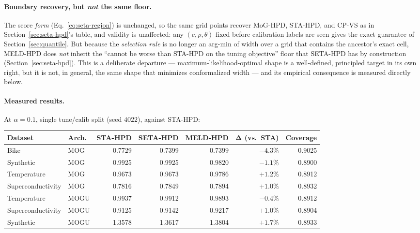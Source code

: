 \documentclass[11pt]{article}
\begin{document}
\paragraph{Boundary recovery, but \emph{not} the same floor.} The score \emph{form}
(Eq.~\eqref{eq:seta-region}) is unchanged, so the same grid points recover MoG-HPD, STA-HPD, and
CP-VS as in Section~\ref{sec:seta-hpd}'s table, and validity is unaffected: any $(c,\rho,\theta)$
fixed before calibration labels are seen gives the exact guarantee of Section~\ref{sec:quantile}.
But because the \emph{selection rule} is no longer an arg-min of width over a grid that contains
the ancestor's exact cell, MELD-HPD does \emph{not} inherit the ``cannot be worse than STA-HPD on
the tuning objective'' floor that SETA-HPD has by construction (Section~\ref{sec:seta-hpd}). This
is a deliberate departure --- maximum-likelihood-optimal shape is a well-defined, principled target
in its own right, but it is not, in general, the same shape that minimizes conformalized width ---
and its empirical consequence is measured directly below.

\paragraph{Measured results.} At $\alpha=0.1$, single tune/calib split (seed $4022$), against
STA-HPD:

\begin{center}
\begin{tabular}{@{}llrrrrr@{}}
\toprule
\textbf{Dataset} & \textbf{Arch.} & \textbf{STA-HPD} & \textbf{SETA-HPD} & \textbf{MELD-HPD} &
$\bm\Delta$ (vs.\ STA) & Coverage \\
\midrule
Bike               & MOG  & 0.7729 & 0.7399 & $\bm{0.7399}$ & $\bm{-4.3\%}$ & 0.9025 \\
Synthetic          & MOG  & 0.9925 & 0.9925 & $\bm{0.9820}$ & $\bm{-1.1\%}$ & 0.8900 \\
Temperature        & MOG  & 0.9673 & 0.9673 & 0.9786 & $+1.2\%$ & 0.8912 \\
Superconductivity  & MOG  & 0.7816 & 0.7849 & 0.7894 & $+1.0\%$ & 0.8932 \\
Temperature        & MOGU & 0.9937 & 0.9912 & $\bm{0.9893}$ & $\bm{-0.4\%}$ & 0.8912 \\
Superconductivity  & MOGU & 0.9125 & 0.9142 & 0.9217 & $+1.0\%$ & 0.8904 \\
Synthetic          & MOGU & 1.3578 & 1.3617 & 1.3804 & $+1.7\%$ & 0.8933 \\
\bottomrule
\end{tabular}
\end{center}
\end{document}
